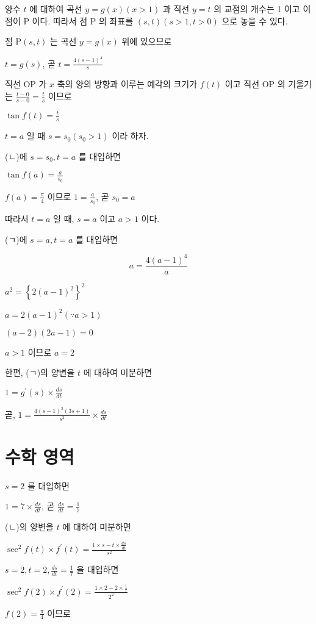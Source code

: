 \documentclass[10pt]{article}
\begin{document}
양수 \(t\) 에 대하여 곡선 \(y=g(x)(x>1)\) 과 직선 \(y=t\) 의 교점의 개수는 1 이고 이 점이 P 이다. 따라서 점 P 의 좌표를 \((s, t)(s>1, t>0)\) 으로 놓을 수 있다.

점 \(\mathrm{P}(s, t)\) 는 곡선 \(y=g(x)\) 위에 있으므로

\(t=g(s)\), 곧 \(t=\frac{4(s-1)^{4}}{s}\)

직선 OP 가 \(x\) 축의 양의 방향과 이루는 예각의 크기가 \(f(t)\) 이고 직선 OP 의 기울기는 \(\frac{t-0}{s-0}=\frac{t}{s}\) 이므로

\(\tan f(t)=\frac{t}{s}\)

\(t=a\) 일 때 \(s=s_{0}\left(s_{0}>1\right)\) 이라 하자.

(ㄴ)에 \(s=s_{0}, t=a\) 를 대입하면

\(\tan f(a)=\frac{a}{s_{0}}\)

\(f(a)=\frac{\pi}{4}\) 이므로 \(1=\frac{a}{s_{0}}\), 곧 \(s_{0}=a\)

따라서 \(t=a\) 일 때, \(s=a\) 이고 \(a>1\) 이다.

(ㄱ)에 \(s=a, t=a\) 를 대입하면

\[
a=\frac{4(a-1)^{4}}{a}
\]

\(a^{2}=\left\{2(a-1)^{2}\right\}^{2}\)

\(a=2(a-1)^{2}(\because a>1)\)

\((a-2)(2 a-1)=0\)

\(a>1\) 이므로 \(a=2\)

한편, (ㄱ)의 양변을 \(t\) 에 대하여 미분하면

\(1=g^{\prime}(s) \times \frac{d s}{d t}\)

곧, \(1=\frac{4(s-1)^{3}(3 s+1)}{s^{2}} \times \frac{d s}{d t}\)

\section*{수학 영역}
\(s=2\) 를 대입하면

\(1=7 \times \frac{d s}{d t}\), 곧 \(\frac{d s}{d t}=\frac{1}{7}\)

(ㄴ)의 양변을 \(t\) 에 대하여 미분하면

\(\sec ^{2} f(t) \times f^{\prime}(t)=\frac{1 \times s-t \times \frac{d s}{d t}}{s^{2}}\)

\(s=2, t=2, \frac{d s}{d t}=\frac{1}{7}\) 을 대입하면

\(\sec ^{2} f(2) \times f^{\prime}(2)=\frac{1 \times 2-2 \times \frac{1}{7}}{2^{2}}\)

\(f(2)=\frac{\pi}{4}\) 이므로
\end{document}
